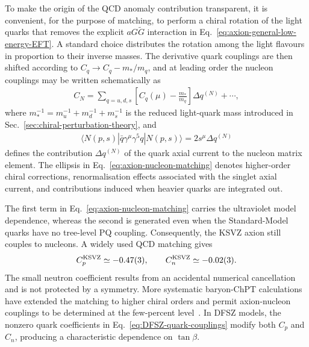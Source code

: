 \documentclass[review]{elsarticle}
\numberwithin{equation}{section}
\numberwithin{table}{section}
\numberwithin{figure}{section}
\begin{document}
To make the origin of the QCD anomaly contribution transparent, it is convenient, for the purpose of matching, to perform a chiral rotation of the light quarks that removes the explicit $aG\widetilde G$ interaction in Eq.~\eqref{eq:axion-general-low-energy-EFT}. A standard choice distributes the rotation among the light flavours in proportion to their inverse masses. The derivative quark couplings are then shifted according to $C_q\rightarrow C_q-m_*/m_q$, and at leading order the nucleon couplings may be written schematically as
\begin{align}
    C_N
    =
    \sum_{q=u,d,s}
    \left[
        C_q(\mu)
        -
        \frac{m_*}{m_q}
    \right]
    \Delta q^{(N)}
    +\cdots ,
    \label{eq:axion-nucleon-matching}
\end{align}
where $m_*^{-1}=m_u^{-1}+m_d^{-1}+m_s^{-1}$ is the reduced light-quark mass introduced in Sec.~\ref{sec:chiral-perturbation-theory}, and
\begin{align}
    \langle N(p,s)|
    \bar q\gamma^\mu\gamma^5q
    |N(p,s)\rangle
    =
    2s^\mu\Delta q^{(N)}
    \label{eq:nucleon-axial-charges}
\end{align}
defines the contribution $\Delta q^{(N)}$ of the quark axial current to the nucleon matrix element. The ellipsis in Eq.~\eqref{eq:axion-nucleon-matching} denotes higher-order chiral corrections, renormalisation effects associated with the singlet axial current, and contributions induced when heavier quarks are integrated out.

The first term in Eq.~\eqref{eq:axion-nucleon-matching} carries the ultraviolet model dependence, whereas the second is generated even when the Standard-Model quarks have no tree-level PQ coupling. Consequently, the KSVZ axion still couples to nucleons. A widely used QCD matching gives~\cite{GrilliDiCortona:2015jxo}
\begin{align}
    C_p^{\rm KSVZ}
    \simeq
    -0.47(3),
    \qquad
    C_n^{\rm KSVZ}
    \simeq
    -0.02(3).
    \label{eq:KSVZ-nucleon-couplings}
\end{align}
The small neutron coefficient results from an accidental numerical cancellation and is not protected by a symmetry. More systematic baryon-ChPT calculations have extended the matching to higher chiral orders and permit axion-nucleon couplings to be determined at the few-percent level~\cite{Vonk:2020zfh}. In DFSZ models, the nonzero quark coefficients in Eq.~\eqref{eq:DFSZ-quark-couplings} modify both $C_p$ and $C_n$, producing a characteristic dependence on $\tan\beta$.
\end{document}
